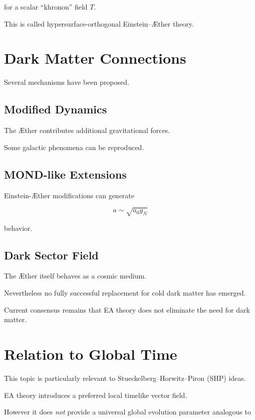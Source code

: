 \documentclass[11pt,a4paper]{article}
\begin{document}
for a scalar ``khronon'' field $T$.

This is called hypersurface-orthogonal Einstein--\AE ther theory.

\section{Dark Matter Connections}

Several mechanisms have been proposed.

\subsection{Modified Dynamics}

The \AE ther contributes additional gravitational forces.

Some galactic phenomena can be reproduced.

\subsection{MOND-like Extensions}

Einstein-\AE ther modifications can generate

\begin{equation}
a \sim \sqrt{a_0 g_N}
\end{equation}

behavior.

\subsection{Dark Sector Field}

The \AE ther itself behaves as a cosmic medium.

Nevertheless no fully successful replacement for
cold dark matter has emerged.

Current consensus remains that EA theory does not eliminate
the need for dark matter.

\section{Relation to Global Time}

This topic is particularly relevant to
Stueckelberg--Horwitz--Piron (SHP) ideas.

EA theory introduces a preferred local timelike vector field.

However it does \emph{not} provide a universal global evolution
parameter analogous to
\end{document}
